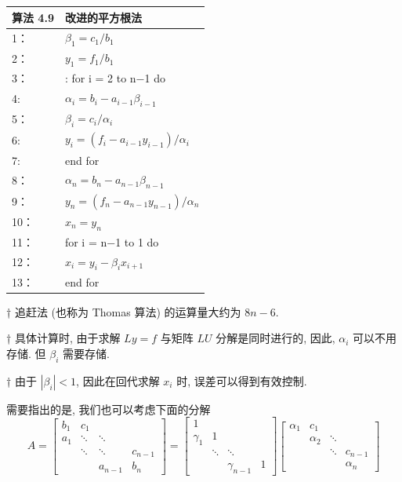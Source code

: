 \documentclass[12pt,a4paper]{article}
\begin{document}
\begin{table}  
	\begin{tabular*}{16cm}{ll}  
		\hline  
		算法 4.9 &改进的平方根法\\  
		\hline  
		1：   & $\beta_{1}=c_{1} / b_{1}$\\  
		2：   & $y_{1}=f_{1} / b_{1}$\\
		3：   & : for i = 2 to n−1 do \\
		4:    & \qquad $\alpha_{i}=b_{i}-a_{i-1} \beta_{i-1}$\\
		5：   & \qquad $\beta_{i}=c_{i} / \alpha_{i}$\\
		6:    & \qquad $y_{i}=\left(f_{i}-a_{i-1} y_{i-1}\right) / \alpha_{i}$\\
		7:   & end for\\
		8：   & $\alpha_{n}=b_{n}-a_{n-1} \beta_{n-1}$ \\
		9：   & $y_{n}=\left(f_{n}-a_{n-1} y_{n-1}\right) / \alpha_{n}$\\
		10：  & $x_{n}=y_{n}$\\
		11：  & for i = n−1 to 1 do\\
		12：  & \qquad $x_{i}=y_{i}-\beta_{i} x_{i+1}$\\
		13：  & end for\\
		\hline  
	\end{tabular*}  
\end{table}


† 追赶法 (也称为 Thomas 算法) 的运算量大约为 $8n − 6$.



† 具体计算时, 由于求解 $Ly = f$ 与矩阵 $LU$ 分解是同时进行的, 因此,
$\alpha_i$ 可以不用存储. 但 $\beta_i$ 需要存储.



† 由于 $|\beta_i| < 1$, 因此在回代求解 $x_i$ 时, 误差可以得到有效控制.


需要指出的是, 我们也可以考虑下面的分解
\begin{equation}
A=\left[\begin{array}{cccc}{b_{1}} & {c_{1}} & {} & {} \\ {a_{1}} & {\ddots} & {\ddots} & {} \\ {} & {\ddots} & {\ddots} & {c_{n-1}} \\ {} & {} & {a_{n-1}} & {b_{n}}\end{array}\right]=\left[\begin{array}{ccccc}{1} \\ {\gamma_{1}} & {1} & {} & {} \\ {} & {\ddots} & {\ddots} & {} \\ {} & {} & {\gamma_{n-1}} & {1}\end{array}\right]\left[\begin{array}{cccc}{\alpha_{1}} & {c_{1}} & {} & {} \\ {} & {\alpha_{2}} & {\ddots} & {} \\ {} & {} & {\ddots} & {c_{n-1}} \\ {} & {} & {} & {\alpha_{n}}\end{array}\right]
\end{equation}
\end{document}
